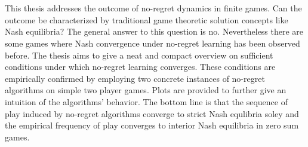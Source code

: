\chapter{\abstractname}

This thesis addresses the outcome of no-regret dynamics in finite games. Can the outcome be characterized by traditional game theoretic solution concepts like Nash equilibria? The general answer to this question is no. Nevertheless there are some games where Nash convergence under no-regret learning has been observed before. The thesis aims to give a neat and compact overview on sufficient conditions under which no-regret learning converges. These conditions are empirically confirmed by employing two concrete instances of no-regret algorithms on simple two player games. Plots are provided to further give an intuition of the algorithms' behavior. The bottom line is that the sequence of play induced by no-regret algorithms converge to strict Nash equlibria soley and the empirical frequency of play converges to interior Nash equilibria in zero sum games.
